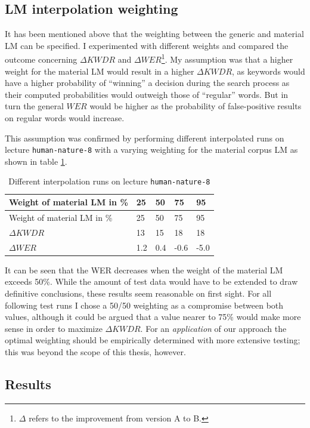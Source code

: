 \documentclass[]{article}
\begin{document}
\subsection{LM interpolation
weighting}\label{lm-interpolation-weighting}

It has been mentioned above that the weighting between the generic and
material LM can be specified. I experimented with different weights and
compared the outcome concerning \(\Delta KWDR\) and
\(\Delta WER\)\footnote{\(\Delta\) refers to the improvement from
  version A to B.}. My assumption was that a higher weight for the
material LM would result in a higher \(\Delta KWDR\), as keywords would
have a higher probability of ``winning'' a decision during the search
process as their computed probabilities would outweigh those of
``regular'' words. But in turn the general \(WER\) would be higher as
the probability of false-positive results on regular words would
increase.

This assumption was confirmed by performing different interpolated runs
on lecture \texttt{human-nature-8} with a varying weighting for the
material corpus LM as shown in table \ref{weighting-test}.

\begin{longtable}[c]{@{}lllll@{}}
\caption{Different interpolation runs on lecture \texttt{human-nature-8}
\label{weighting-test}}\tabularnewline
\toprule
Weight of material LM in \% & 25 & 50 & 75 & 95\tabularnewline
\midrule
\endfirsthead
\toprule
Weight of material LM in \% & 25 & 50 & 75 & 95\tabularnewline
\midrule
\endhead
\(\Delta KWDR\) & 13 & 15 & 18 & 18\tabularnewline
\(\Delta WER\) & 1.2 & 0.4 & -0.6 & -5.0\tabularnewline
\bottomrule
\end{longtable}

It can be seen that the WER decreases when the weight of the material LM
exceeds 50\%. While the amount of test data would have to be extended to
draw definitive conclusions, these results seem reasonable on first
sight. For all following test runs I chose a 50/50 weighting as a
compromise between both values, although it could be argued that a value
nearer to 75\% would make more sense in order to maximize
\(\Delta KWDR\). For an \emph{application} of our approach the optimal
weighting should be empirically determined with more extensive testing;
this was beyond the scope of this thesis, however.

\subsection{Results}\label{results}
\end{document}
